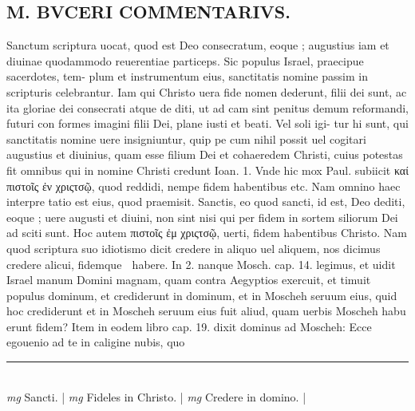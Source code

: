 \documentclass{article}
\begin{document}
\begin{pages}
\section*{M. BVCERI COMMENTARIVS.  }
\marginpar{[ p.19 ]}\pstart Sanctum scriptura uocat, quod est Deo consecratum, eoque ; augustius iam et diuinae quodammodo reuerentiae particeps.  Sic populus Israel, praecipue sacerdotes, tem- plum et instrumentum eius, sanctitatis nomine passim in scripturis celebrantur.  Iam qui Christo uera fide nomen dederunt, filii dei sunt, ac ita gloriae dei consecrati atque  de diti, ut ad cam sint penitus demum reformandi, futuri con formes imagini filii Dei, plane iusti et beati.  Vel soli igi- tur hi sunt, qui sanctitatis nomine uere insigniuntur, quip pe cum nihil possit uel cogitari augustius et diuinius, quam esse filium Dei et cohaeredem Christi, cuius potestas fit omnibus qui in nomine Christi credunt Ioan. 1.  Vnde hic mox Paul.  subiicit καί πιστοῖς ἐν χριςτσῷ, quod reddidi, nempe fidem habentibus etc. Nam omnino haec interpre tatio est eius, quod praemisit. Sanctis, eo quod sancti, id est, Deo dediti, eoque ; uere augusti et diuini, non sint nisi qui per fidem in sortem siliorum Dei ad sciti sunt.  \pend\pstart Hoc autem πιστοῖς ἐμ χριςτσῷ, uerti, fidem habentibus Christo.  Nam quod scriptura suo idiotismo dicit credere in aliquo uel aliquem, nos dicimus credere alicui, fidemque  habere.  In 2.  nanque Mosch.  cap. 14. legimus, et uidit Israel manum Domini magnam, quam contra Aegyptios exercuit, et timuit populus dominum, et crediderunt in dominum, et in Moscheh seruum eius, quid hoc crediderunt et in Moscheh seruum eius fuit aliud, quam uerbis Moscheh habu erunt fidem? Item in eodem libro cap. 19. dixit dominus ad Moscheh: Ecce egouenio ad te in caligine nubis, quo  \pend
\vspace{0.5cm}\noindent
\vspace{0.2cm}\rule{1cm}{0.2pt}\\ 
\hspace{0.2cm}\textit{mg}
\footnotesize Sancti. 
\normalsize| 
\hspace{0.2cm}\textit{mg}
\footnotesize Fideles in Christo. 
\normalsize| 
\hspace{0.2cm}\textit{mg}
\footnotesize Credere in domino. 
\normalsize| 

\end{pages}
\end{document}
